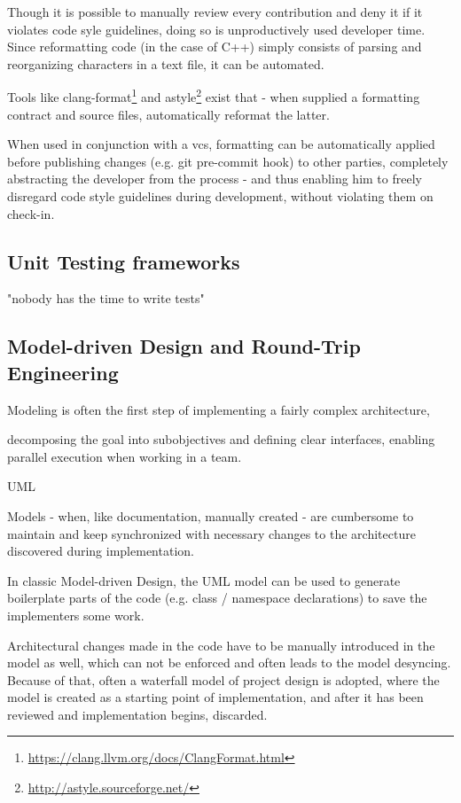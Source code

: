 Though it is possible to manually review every contribution and deny it if it violates code syle guidelines, doing so is unproductively used developer time. Since reformatting code (in the case of C++) simply consists of parsing and reorganizing characters in a text file, it can be automated.

Tools like clang-format\footnote{\url{https://clang.llvm.org/docs/ClangFormat.html}} and astyle\footnote{\url{http://astyle.sourceforge.net/}} exist that - when supplied a formatting contract and source files, automatically reformat the latter.

When used in conjunction with a \gls{vcs}, formatting can be automatically applied before publishing changes (e.g. git pre-commit hook) to other parties, completely abstracting the developer from the process - and thus enabling him to freely disregard code style guidelines during development, without violating them on check-in.

\subsection{Unit Testing frameworks}

"nobody has the time to write tests"

\subsection{Model-driven Design and Round-Trip Engineering}
Modeling is often the first step of implementing a fairly complex architecture, 

decomposing the goal into subobjectives and defining clear interfaces, enabling parallel execution when working in a team.

UML

Models - when, like documentation, manually created - are cumbersome to maintain and keep synchronized with necessary changes to the architecture discovered during implementation.

In classic Model-driven Design, the UML model can be used to generate boilerplate parts of the code (e.g. class / namespace declarations) to save the implementers some work.

Architectural changes made in the code have to be manually introduced in the model as well, which can not be enforced and often leads to the model desyncing. Because of that, often a waterfall model of project design is adopted, where the model is created as a starting point of implementation, and after it has been reviewed and implementation begins, discarded.

